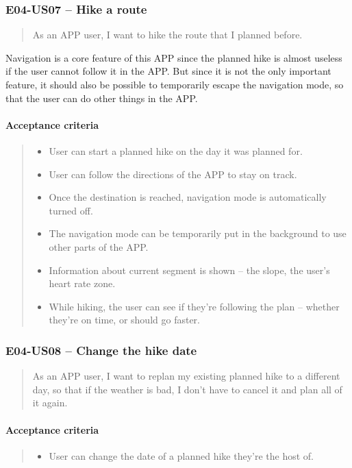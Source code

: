 \subsubsection*{E04-US07 -- Hike a route}
\begin{quote}
As an APP user, I want to hike the route that I planned before.
\end{quote}

Navigation is a core feature of this APP since the planned hike is almost useless if the user cannot follow it in the APP.
But since it is not the only important feature, it should also be possible to temporarily escape the navigation mode, so that the user can do other things in the APP.

\paragraph*{Acceptance criteria}
\begin{quote}
\begin{itemize}
    \item User can start a planned hike on the day it was planned for.
    \item User can follow the directions of the APP to stay on track.
    \item Once the destination is reached, navigation mode is automatically turned off.
    \item The navigation mode can be temporarily put in the background to use other parts of the APP.
    \item Information about current segment is shown -- the slope, the user's heart rate zone.
    \item While hiking, the user can see if they're following the plan -- whether they're on time, or should go faster.
\end{itemize}
\end{quote}

\subsubsection*{E04-US08 -- Change the hike date}
\begin{quote}
As an APP user, I want to replan my existing planned hike to a different day, so that if the weather is bad, I don't have to cancel it and plan all of it again.
\end{quote}

\paragraph*{Acceptance criteria}
\begin{quote}
\begin{itemize}
    \item User can change the date of a planned hike they're the host of.
\end{itemize}
\end{quote}



